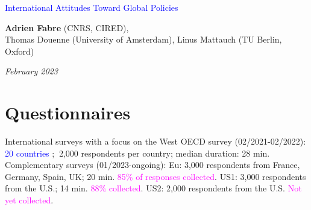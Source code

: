 
\usepackage{multicol}
              


\begin{frame}
\thispagestyle{empty}
\begin{center}
\begin{LARGE}
\textcolor{blue}{International Attitudes Toward Global Policies}
\end{LARGE}

\vspace{1cm}
\textbf{Adrien Fabre} (CNRS, CIRED),\\ Thomas Douenne (University of Amsterdam), Linus Mattauch (TU Berlin, Oxford)

\medskip
{}
\textit{February 2023} 

\end{center}

\bigskip

\end{frame}


\section{Questionnaires}

\begin{frame}{International surveys with a focus on the West\label{questionnaires}}
    \bbvs
    \ip OECD survey (02/2021-02/2022): 
    \bbvs \ip \textcolor{blue}{20 countries}%
    ; $~$2,000 respondents per country; median duration: 28 min. \ee
    \ip Complementary surveys (01/2023-ongoing): 
    \bbvs \ip Eu: 3,000 respondents from France, Germany, Spain, UK; 20 min. \textcolor{magenta}{85\% of responses collected}.
    \ip US1: 3,000 respondents from the U.S.; 14 min. \textcolor{magenta}{88\% collected}.
    \ip US2: 2,000 respondents from the U.S. \textcolor{magenta}{Not yet collected}.
    \ee 
    \ee \vspace*{-.2cm}
\end{frame}


